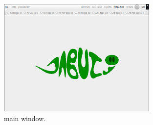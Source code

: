 
\begin{figure}[!ht]
\begin{center}
\includegraphics[width=0.70\textwidth]{fig/initial-screen.eps}
\caption{\label{fig:jabuti-initial}\toolname main window.}
\end{center}
\end{figure}
